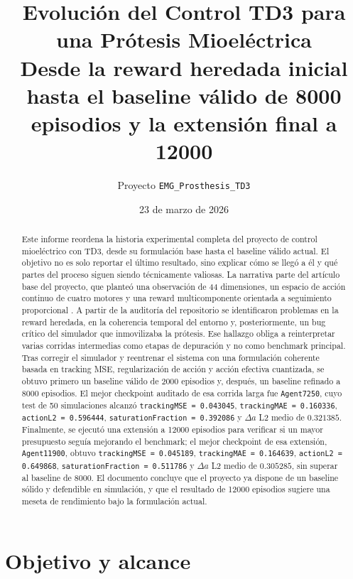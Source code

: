 \documentclass[11pt,a4paper]{article}
\title{\textbf{Evoluci\'on del Control TD3 para una Pr\'otesis Mioel\'ectrica}\\
\large Desde la reward heredada inicial hasta el baseline v\'alido de 8000 episodios y la extensi\'on final a 12000}
\author{Proyecto \texttt{EMG\_Prosthesis\_TD3}}
\date{23 de marzo de 2026}
\begin{document}
\maketitle

\begin{abstract}
Este informe reordena la historia experimental completa del proyecto de control mioel\'ectrico con TD3, desde su formulaci\'on base hasta el baseline v\'alido actual. El objetivo no es solo reportar el \'ultimo resultado, sino explicar c\'omo se lleg\'o a \'el y qu\'e partes del proceso siguen siendo t\'ecnicamente valiosas. La narrativa parte del art\'iculo base del proyecto, que plante\'o una observaci\'on de 44 dimensiones, un espacio de acci\'on continuo de cuatro motores y una reward multicomponente orientada a seguimiento proporcional \citep{fuertes2026continuous}. A partir de la auditor\'ia del repositorio se identificaron problemas en la reward heredada, en la coherencia temporal del entorno y, posteriormente, un bug cr\'itico del simulador que inmovilizaba la pr\'otesis. Ese hallazgo obliga a reinterpretar varias corridas intermedias como etapas de depuraci\'on y no como benchmark principal. Tras corregir el simulador y reentrenar el sistema con una formulaci\'on coherente basada en tracking MSE, regularizaci\'on de acci\'on y acci\'on efectiva cuantizada, se obtuvo primero un baseline v\'alido de 2000 episodios y, despu\'es, un baseline refinado a 8000 episodios. El mejor checkpoint auditado de esa corrida larga fue \texttt{Agent7250}, cuyo test de 50 simulaciones alcanz\'o \texttt{trackingMSE = 0.043045}, \texttt{trackingMAE = 0.160336}, \texttt{actionL2 = 0.596444}, \texttt{saturationFraction = 0.392086} y \(\Delta a\) L2 medio de \(0.321385\). Finalmente, se ejecut\'o una extensi\'on a 12000 episodios para verificar si un mayor presupuesto segu\'ia mejorando el benchmark; el mejor checkpoint de esa extensi\'on, \texttt{Agent11900}, obtuvo \texttt{trackingMSE = 0.045189}, \texttt{trackingMAE = 0.164639}, \texttt{actionL2 = 0.649868}, \texttt{saturationFraction = 0.511786} y \(\Delta a\) L2 medio de \(0.305285\), sin superar al baseline de 8000. El documento concluye que el proyecto ya dispone de un baseline s\'olido y defendible en simulaci\'on, y que el resultado de 12000 episodios sugiere una meseta de rendimiento bajo la formulaci\'on actual.
\end{abstract}

\section{Objetivo y alcance}
\end{document}
